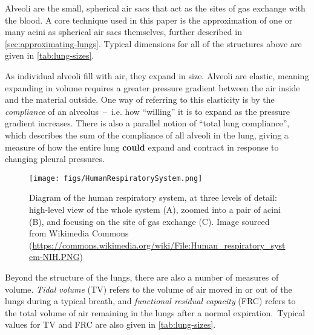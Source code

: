 Alveoli are the small, spherical air sacs that act as the sites of gas exchange with the blood. A
core technique used in this paper is the approximation of one or many acini as spherical air sacs
themselves, further described in \autoref{sec:approximating-lungs}. Typical dimensions for all of
the structures above are given in
\autoref{tab:lung-sizes}.

As individual alveoli fill with air, they expand in size. Alveoli are elastic, meaning expanding in
volume requires a greater pressure gradient between the air inside and the material outside. One way
of referring to this elasticity is by the \textit{compliance} of an alveolus~--~i.e. how ``willing''
it is to expand as the pressure gradient increases. There is also a parallel notion of ``total lung
compliance'', which describes the sum of the compliance of all alveoli in the lung, giving a measure
of how the entire lung \textbf{could} expand and contract in response to changing pleural
pressures.\footnotemark


\begin{figure}[t]
    \centering
    \texttt{[image: figs/HumanRespiratorySystem.png]}
    \caption{
        Diagram of the human respiratory system, at three levels of detail: high-level view of the
        whole system (A), zoomed into a pair of acini (B), and focusing on the site of gas exchange
        (C). Image sourced from Wikimedia Commons \\
        (\url{https://commons.wikimedia.org/wiki/File:Human\_respiratory\_system-NIH.PNG})
    }
\end{figure}

Beyond the structure of the lungs, there are also a number of measures of volume. \textit{Tidal
volume} (TV) refers to the volume of air moved in or out of the lungs during a typical breath, and
\textit{functional residual capacity} (FRC) refers to the total volume of air remaining in the lungs
after a normal expiration.\footnotemark\ Typical values for TV and FRC are also given in
\autoref{tab:lung-sizes}.


